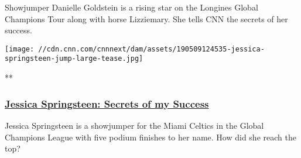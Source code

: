 Showjumper Danielle Goldstein is a rising star on the Longines Global
Champions Tour along with horse Lizziemary. She tells CNN the secrets of
her success.

\href{/videos/sports/2019/05/23/jessica-springsteen-secrets-of-my-success-horse-showjumping-global-champions-tour-lon-orig-spt-intl.cnn}{}

\texttt{[image: //cdn.cnn.com/cnnnext/dam/assets/190509124535-jessica-springsteen-jump-large-tease.jpg]}

**

\hypertarget{jessica-springsteen-secrets-of-my-success}{%
\subsubsection{\texorpdfstring{\href{/videos/sports/2019/05/23/jessica-springsteen-secrets-of-my-success-horse-showjumping-global-champions-tour-lon-orig-spt-intl.cnn}{Jessica
Springsteen: Secrets of my
Success}}{Jessica Springsteen: Secrets of my Success}}\label{jessica-springsteen-secrets-of-my-success}}

Jessica Springsteen is a showjumper for the Miami Celtics in the Global
Champions League with five podium finishes to her name. How did she
reach the top?

\hypertarget{-}{%
\subsection{~}\label{-}}

